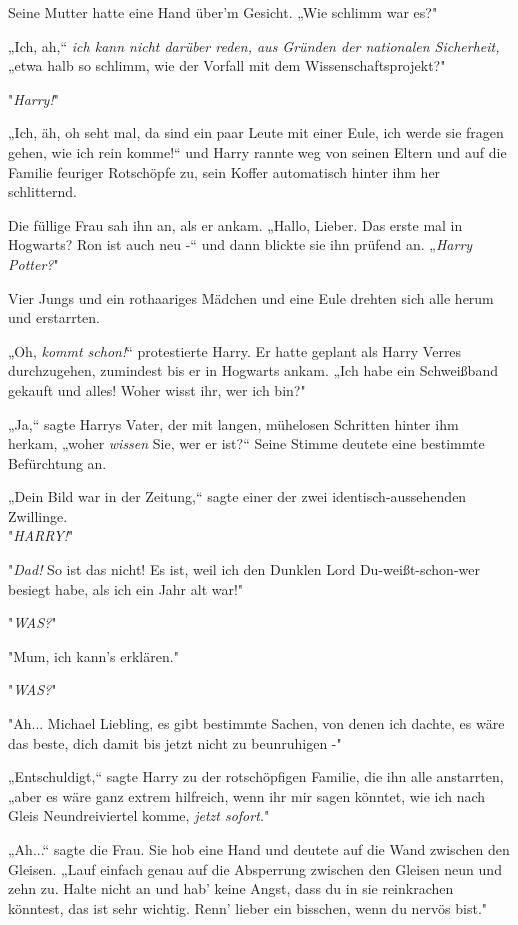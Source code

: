 {Seine Mutter hatte eine Hand über'm Gesicht. „Wie schlimm war es?"

„Ich, ah,“ \emph{ich kann nicht darüber reden, aus Gründen der nationalen Sicherheit,} „etwa halb so schlimm, wie der Vorfall mit dem Wissenschaftsprojekt?"

"\emph{Harry!}"

„Ich, äh, oh seht mal, da sind ein paar Leute mit einer Eule, ich werde sie fragen gehen, wie ich rein komme!“ und Harry rannte weg von seinen Eltern und auf die Familie feuriger Rotschöpfe zu, sein Koffer automatisch hinter ihm her schlitternd.

Die füllige Frau sah ihn an, als er ankam. „Hallo, Lieber. Das erste mal in Hogwarts? Ron ist auch neu -“ und dann blickte sie ihn prüfend an. „\emph{Harry Potter?}"

Vier Jungs und ein rothaariges Mädchen und eine Eule drehten sich alle herum und erstarrten.

„Oh, \emph{kommt schon!}“ protestierte Harry. Er hatte geplant als Harry Verres durchzugehen, zumindest bis er in Hogwarts ankam. „Ich habe ein Schweißband gekauft und alles! Woher wisst ihr, wer ich bin?"

„Ja,“ sagte Harrys Vater, der mit langen, mühelosen Schritten hinter ihm herkam, „woher \emph{wissen} Sie, wer er ist?“ Seine Stimme deutete eine bestimmte Befürchtung an.

„Dein Bild war in der Zeitung,“ sagte einer der zwei identisch-aussehenden Zwillinge.\\ "\emph{HARRY!}"

"\emph{Dad!} So ist das nicht! Es ist, weil ich den Dunklen Lord Du-weißt-schon-wer besiegt habe, als ich ein Jahr alt war!"

"\emph{WAS?}"

"Mum, ich kann's erklären."

"\emph{WAS?}"

"Ah... Michael Liebling, es gibt bestimmte Sachen, von denen ich dachte, es wäre das beste, dich damit bis jetzt nicht zu beunruhigen -"

„Entschuldigt,“ sagte Harry zu der rotschöpfigen Familie, die ihn alle anstarrten, „aber es wäre ganz extrem hilfreich, wenn ihr mir sagen könntet, wie ich nach Gleis Neundreiviertel komme, \emph{jetzt sofort.}"

„Ah...“ sagte die Frau. Sie hob eine Hand und deutete auf die Wand zwischen den Gleisen. „Lauf einfach genau auf die Absperrung zwischen den Gleisen neun und zehn zu. Halte nicht an und hab' keine Angst, dass du in sie reinkrachen könntest, das ist sehr wichtig. Renn' lieber ein bisschen, wenn du nervös bist."

}
